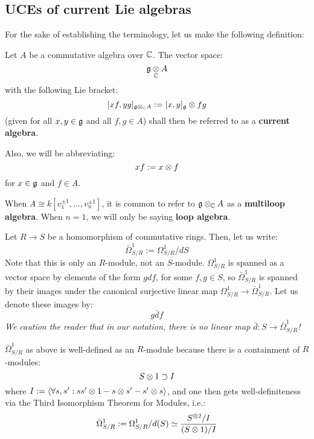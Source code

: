     \subsection{UCEs of current Lie algebras}
        For the sake of establishing the terminology, let us make the following definition:
        \begin{definition} \label{def: current_algebras}
            Let $A$ be a commutative algebra over $\mathbb{C}$. The vector space:
                $$\g \tensor_{\bbC} A$$
            with the following Lie bracket:
                $$[x f, y g]_{\g \tensor_{\bbC} A} := [x, y]_{\g} \tensor fg$$
            (given for all $x, y \in \mathfrak{g}$ and all $f, g \in A$) shall then be referred to as a \textbf{current algebra}. 
                
            Also, we will be abbreviating:
                $$xf := x \tensor f$$
            for $x \in \mathfrak{g}$ and $f \in A$.
        \end{definition}
        \begin{remark}
            When $A \cong k[v_1^{\pm 1}, ..., v_n^{\pm 1}]$, it is common to refer to $\g \tensor_{\bbC} A$ as a \textbf{multiloop algebra}. When $n = 1$, we will only be saying \textbf{loop algebra}.
        \end{remark}

        \begin{convention} \label{conv: cyclic_1_forms}
            Let $R \to S$ be a homomorphism of commutative rings. Then, let us write:
                $$\bar{\Omega}^1_{S/R} := \Omega^1_{S/R}/dS$$
            Note that this is only an $R$-module, not an $S$-module. $\Omega^1_{S/R}$ is spanned as a vector space by elements of the form $g df$, for some $f, g \in S$, so $\bar{\Omega}^1_{S/R}$ is spanned by their images under the canonical surjective linear map $\Omega^1_{S/R} \to \bar{\Omega}^1_{S/R}$. Let us denote these images by:
                $$g\bar{d}f$$
            \textit{We caution the reader that in our notation, there is no linear map $\bar{d}: S \to \bar{\Omega}^1_{S/R}$!}
        \end{convention}
        \begin{remark} \label{remark: cyclic_1_form_well_definiteness}
            $\bar{\Omega}^1_{S/R}$ as above is well-defined as an $R$-module because there is a containment of $R$-modules:
                $$S \tensor 1 \supset I$$
            where $I := \< \forall s, s': ss' \tensor 1 - s \tensor s' - s' \tensor s \>$, and one then gets well-definiteness via the Third Isomorphism Theorem for Modules, i.e.:
                $$\bar{\Omega}^1_{S/R} := \Omega^1_{S/R}/d(S) \cong \frac{S^{\tensor 2}/I}{(S \tensor 1)/I}$$
        \end{remark}

